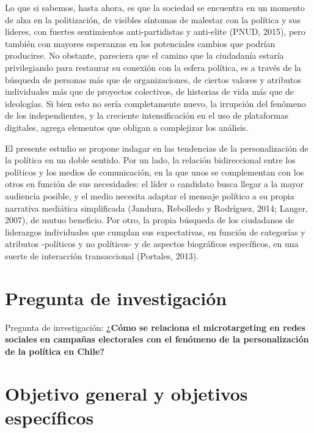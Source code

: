 \documentclass[
  10pt,
  letterpaper,
]{report}
\begin{document}
Lo que si sabemos, hasta ahora, es que la sociedad se encuentra en un
momento de alza en la politización, de visibles síntomas de malestar con
la política y sus líderes, con fuertes sentimientos anti-partidistas y
anti-elite (PNUD, 2015), pero también con mayores esperanzas en los
potenciales cambios que podrían producirse. No obstante, pareciera que
el camino que la ciudadanía estaría privilegiando para restaurar su
conexión con la esfera política, es a través de la búsqueda de personas
más que de organizaciones, de ciertos valores y atributos individuales
más que de proyectos colectivos, de historias de vida más que de
ideologías. Si bien esto no sería completamente nuevo, la irrupción del
fenómeno de los independientes, y la creciente intensificación en el uso
de plataformas digitales, agrega elementos que obligan a complejizar los
análisis.

El presente estudio se propone indagar en las tendencias de la
personalización de la política en un doble sentido. Por un lado, la
relación bidireccional entre los políticos y los medios de comunicación,
en la que unos se complementan con los otros en función de sus
necesidades: el líder o candidato busca llegar a la mayor audiencia
posible, y el medio necesita adaptar el mensaje político a su propia
narrativa mediática simplificada (Jandura, Rebolledo y Rodríguez, 2014;
Langer, 2007), de mutuo beneficio. Por otro, la propia búsqueda de los
ciudadanos de liderazgos individuales que cumplan sus expectativas, en
función de categorías y atributos -políticos y no políticos- y de
aspectos biográficos específicos, en una suerte de interacción
transaccional (Portales, 2013).

\hypertarget{pregunta-de-investigaciuxf3n}{%
\section{Pregunta de investigación}\label{pregunta-de-investigaciuxf3n}}

Pregunta de investigación: \textbf{¿Cómo se relaciona el microtargeting
en redes sociales en campañas electorales con el fenómeno de la
personalización de la política en Chile?}

\hypertarget{objetivo-general-y-objetivos-especuxedficos}{%
\section{Objetivo general y objetivos
específicos}\label{objetivo-general-y-objetivos-especuxedficos}}
\end{document}
